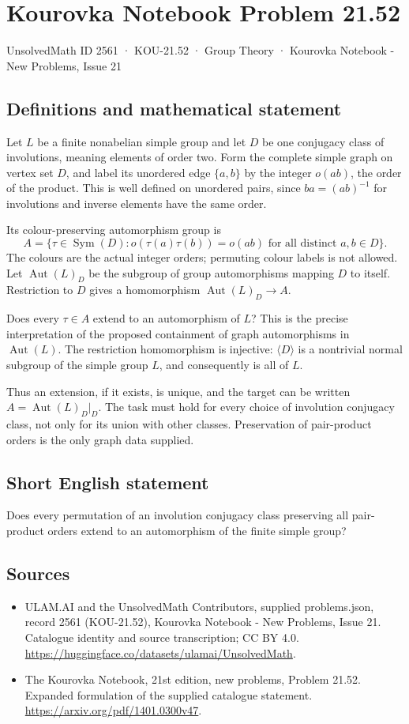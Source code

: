 \documentclass[11pt,a4paper]{article}
\begin{document}
\section*{Kourovka Notebook Problem 21.52}\label{2561}
{\small UnsolvedMath ID 2561 · KOU-21.52 · Group Theory · Kourovka Notebook - New Problems, Issue 21}
\subsection{Definitions and mathematical statement}
Let $L$ be a finite nonabelian simple group and let $D$ be one conjugacy
class of involutions, meaning elements of order two. Form the complete
simple graph on vertex set $D$, and label its unordered edge $\{a,b\}$
by the integer $o(ab)$, the order of the product. This is well defined
on unordered pairs, since $ba=(ab)^{-1}$ for involutions and inverse
elements have the same order.

Its colour-preserving automorphism group is
\[
 A=\{\tau\in\operatorname{Sym}(D):
        o(\tau(a)\tau(b))=o(ab)\text{ for all distinct }a,b\in D\}.
\]
The colours are the actual integer orders; permuting colour labels
is not allowed. Let $\operatorname{Aut}(L)_D$ be the subgroup of group
automorphisms mapping $D$ to itself. Restriction to $D$ gives a homomorphism
$\operatorname{Aut}(L)_D\to A$.

Does every $\tau\in A$ extend to an automorphism of $L$? This is the
precise interpretation of the proposed containment of graph automorphisms
in $\operatorname{Aut}(L)$. The restriction homomorphism is injective:
$\langle D\rangle$ is a nontrivial normal subgroup of the simple group
$L$, and consequently is all of $L$.

Thus an extension, if it exists, is unique, and the target can be written
$A=\operatorname{Aut}(L)_D|_D$. The task must hold for every choice of
involution conjugacy class, not only for its union with other classes.
Preservation of pair-product orders is the only graph data supplied.
\subsection{Short English statement}
Does every permutation of an involution conjugacy class preserving all pair-product orders extend to an automorphism of the finite simple group?
\subsection{Sources}
\begin{itemize}
\item[S1] ULAM.AI and the UnsolvedMath Contributors, supplied problems.json, record 2561 (KOU-21.52), Kourovka Notebook - New Problems, Issue 21. Catalogue identity and source transcription; CC BY 4.0.
\url{https://huggingface.co/datasets/ulamai/UnsolvedMath}.
\item[S2] The Kourovka Notebook, 21st edition, new problems, Problem 21.52. Expanded formulation of the supplied catalogue statement.
\url{https://arxiv.org/pdf/1401.0300v47}.
\end{itemize}
\end{document}
